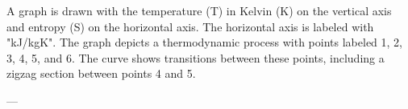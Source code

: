 A graph is drawn with the temperature (T) in Kelvin (K) on the vertical axis and entropy (S) on the horizontal axis. The horizontal axis is labeled with "kJ/kgK". The graph depicts a thermodynamic process with points labeled 1, 2, 3, 4, 5, and 6. The curve shows transitions between these points, including a zigzag section between points 4 and 5.

---